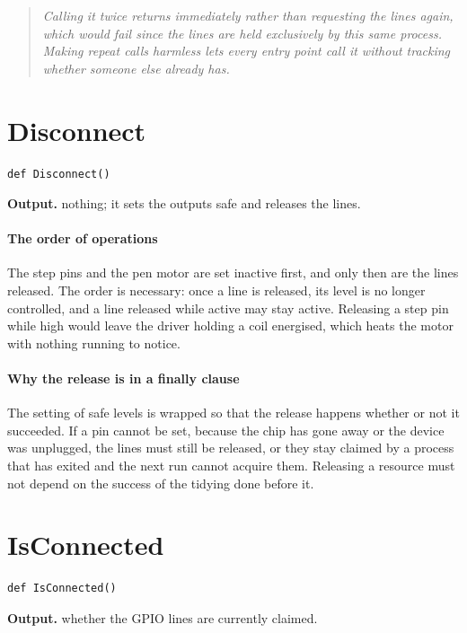 \begin{quote}\small\itshape Calling it twice returns immediately rather than requesting the lines again, which would fail since the lines are held exclusively by this same process. Making repeat calls harmless lets every entry point call it without tracking whether someone else already has.\end{quote}

\section{Disconnect}
\begin{lstlisting}[style=sig]
def Disconnect()
\end{lstlisting}

\noindent\textbf{Output.} nothing; it sets the outputs safe and releases the lines.


\paragraph{The order of operations}
The step pins and the pen motor are set inactive first, and only then are the lines released. The order is necessary: once a line is released, its level is no longer controlled, and a line released while active may stay active. Releasing a step pin while high would leave the driver holding a coil energised, which heats the motor with nothing running to notice.


\paragraph{Why the release is in a finally clause}
The setting of safe levels is wrapped so that the release happens whether or not it succeeded. If a pin cannot be set, because the chip has gone away or the device was unplugged, the lines must still be released, or they stay claimed by a process that has exited and the next run cannot acquire them. Releasing a resource must not depend on the success of the tidying done before it.


\section{IsConnected}
\begin{lstlisting}[style=sig]
def IsConnected()
\end{lstlisting}

\noindent\textbf{Output.} whether the GPIO lines are currently claimed.


